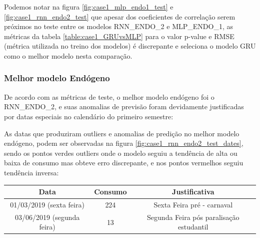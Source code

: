             Podemos notar na figura \ref{fig:case1_mlp_endo1_test} e \ref{fig:case1_rnn_endo2_test} que apesar dos coeficientes de correlação serem próximos no teste entre os modelos RNN\_ENDO\_2 e MLP\_ENDO\_1, as métricas da tabela \ref{table:case1_GRUvsMLP} para o valor p-value e RMSE (métrica utilizada no treino dos modelos) é discrepante e seleciona o modelo GRU como o melhor modelo nesta comparação.\newline

    	    \subsubsection{Melhor modelo Endógeno}
            De acordo com as métricas de teste, o melhor modelo endógeno foi o RNN\_ENDO\_2, e suas anomalias de previsão foram devidamente justificadas por datas especiais no calendário do primeiro semestre:
            
            \begin{figure}[H]
            \end{figure}
            
            As datas que produziram outliers e anomalias de predição no melhor modelo endógeno, podem ser observadas na figura \ref{fig:case1_rnn_endo2_test_dates}, sendo os pontos verdes outliers onde o modelo seguiu a tendência de alta ou baixa de consumo mas obteve erro discrepante, e nos pontos vermelhos seguiu tendência inversa:

            \begin{table}[!ht]
                \centering
                 \begin{tabular}{|c|c|c|}
                 \rowcolor{gray!50}
                 \hline 
             Data & Consumo & Justificativa\\ \hline    
            01/03/2019 (sexta feira)    & 224 & Sexta Feira pré - carnaval\\
             03/06/2019 (segunda feira)  &  13 & Segunda Feira pós paralisação estudantil\\ \hline \end{tabular} \end{table}

